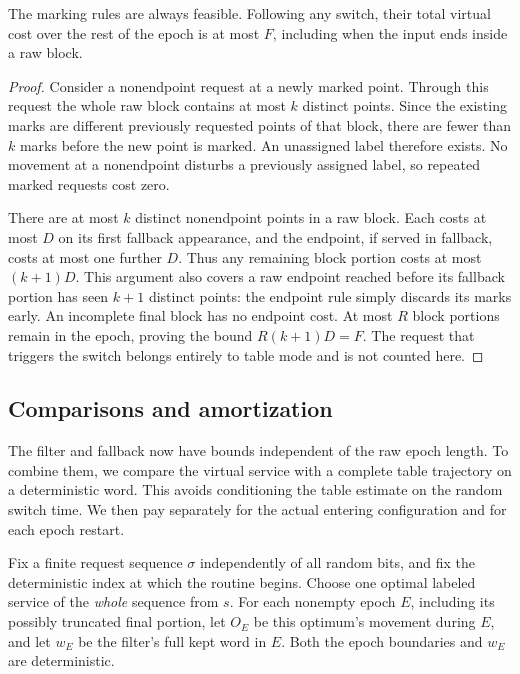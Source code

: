 \begin{lemma}\label{lem:fallback}
The marking rules are always feasible.  Following any switch, their
total virtual cost over the rest of the epoch is at most $F$, including
when the input ends inside a raw block.
\end{lemma}

\begin{proof}
Consider a nonendpoint request at a newly marked point.  Through this
request the whole raw block contains at most $k$ distinct points.  Since
the existing marks are different previously requested points of that
block, there are fewer than $k$ marks before the new point is marked.
An unassigned label therefore exists.  No movement at a nonendpoint
disturbs a previously assigned label, so repeated marked requests cost
zero.

There are at most $k$ distinct nonendpoint points in a raw block.  Each
costs at most $D$ on its first fallback appearance, and the endpoint,
if served in fallback, costs at most one further $D$.  Thus any remaining
block portion costs at most $(k+1)D$.  This argument also covers a raw
endpoint reached before its fallback portion has seen $k+1$ distinct
points: the endpoint rule simply discards its marks early.  An incomplete
final block has no endpoint cost.  At most $R$ block portions remain in
the epoch, proving the bound $R(k+1)D=F$.  The request that triggers the
switch belongs entirely to table mode and is not counted here.
\end{proof}

\subsection{Comparisons and amortization}

The filter and fallback now have bounds independent of the raw epoch
length. To combine them, we compare the virtual service with a complete
table trajectory on a deterministic word. This avoids conditioning the
table estimate on the random switch time. We then pay separately for the
actual entering configuration and for each epoch restart.

Fix a finite request sequence $\sigma$ independently of all random bits,
and fix the deterministic index at which the routine begins.  Choose
one optimal labeled service of the \emph{whole} sequence from $s$.
For each nonempty epoch $E$, including its possibly truncated final
portion, let $O_E$ be this optimum's movement during $E$, and let $w_E$
be the filter's full kept word in $E$.  Both the epoch boundaries and
$w_E$ are deterministic.


